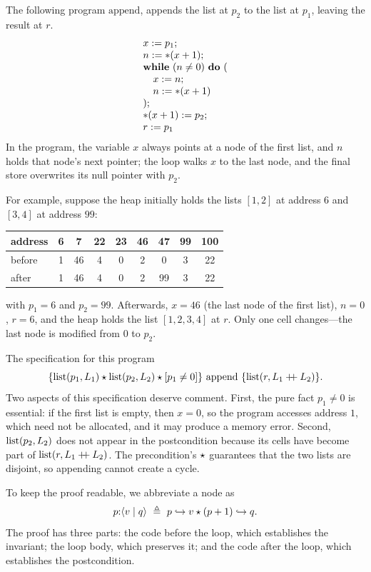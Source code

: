 The following program $\mathrm{append}$, appends the list at $p_2$ to the list at $p_1$, leaving
the result at $r$.
\[
  \begin{array}{l}
    x:=p_1;\\
    n:=\ast(x+1);\\
    \mathbf{while}\ (n\neq 0)\ \mathbf{do}\ (\\
    \quad x:=n;\\
    \quad n:=\ast(x+1)\\
    );\\
    \ast(x+1):=p_2;\\
    r:=p_1
  \end{array}
\]
In the program, the variable $x$ always points at a node of the first list, and $n$ holds that
node's next pointer; the loop walks $x$ to the last node, and the final store overwrites its null
pointer with $p_2$.

For example, suppose the heap initially holds the lists $[1,2]$ at address $6$ and $[3,4]$ at
address $99$:
\begin{center}
\begin{tabular}{l|cccccccc}
  address & 6 & 7 & 22 & 23 & 46 & 47 & 99 & 100\\\hline
  before  & 1 & 46 & 4 & 0 & 2 & 0 & 3 & 22\\
  after   & 1 & 46 & 4 & 0 & 2 & 99 & 3 & 22
\end{tabular}
\end{center}
with $p_1=6$ and $p_2=99$. Afterwards, $x=46$ (the last node of the first list), $n=0$, $r=6$, and
the heap holds the list $[1,2,3,4]$ at $r$. Only one cell changes---the last node is modified from
$0$ to $p_2$.

The specification for this program
\[
  \{\mathrm{list}(p_1,L_1)\mathbin{\star}\mathrm{list}(p_2,L_2)\mathbin{\star}[p_1\neq 0]\}\ \mathrm{append}\ \{\mathrm{list}(r,L_1\mathbin{+\!\!+} L_2)\}.
\]
Two aspects of this specification deserve comment. First, the pure fact $p_1\neq 0$ is essential:
if the first list is empty, then $x=0$, so the program accesses address $1$, which need not be
allocated, and it may produce a memory error. Second, $\mathrm{list}(p_2,L_2)$ does not appear in the
postcondition because its cells have become part of $\mathrm{list}(r,L_1\mathbin{+\!\!+} L_2)$. The precondition's
$\mathbin{\star}$ guarantees that the two lists are disjoint, so appending cannot create a cycle.

To keep the proof readable, we abbreviate a node as
\[
  p{:}\langle v\mid q\rangle\ \triangleq\ p\hookrightarrow v\mathbin{\star}(p+1)\hookrightarrow q.
\]
The proof has three parts: the code before the loop, which establishes the invariant; the loop
body, which preserves it; and the code after the loop, which establishes the postcondition.

